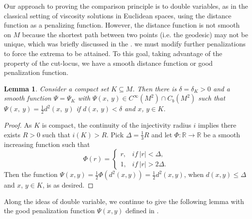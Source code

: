 \documentclass[a4paper]{article}
\numberwithin{equation}{section}
\newtheorem{lemma}[theorem]{Lemma}
\theoremstyle{definition}
\begin{document}
\par
Our approach to proving the comparison principle is to double variables, as in the classical setting of viscosity solutions in Euclidean spaces, using the distance function as a penalizing function. However, the distance function is not smooth on $M$ because the shortest path between two points (i.e. the geodesic) may not be unique, which was briefly discussed in the .
we must modify further penalizations to force the extrema to be attained. To this goal, taking advantage of  the property of the cut-locus, we have a smooth distance function or good penalization function.
\begin{lemma}\label{lem_smooth_function}
    Consider a compact set $K \subseteq M$. Then there is $\delta = \delta_K > 0$ and a smooth function $\Psi = \Psi_K$ with $\Psi(x,~y) \in C^\infty(M^2)\cap C_b(M^2)$ such that $\Psi(x,~y) = \frac{1}{2}d^2(x,~y)$ if $d(x,~y) <\delta $ and $x$, $y\in K$.
\end{lemma}
\begin{proof}
    As $K$ is compact, the continuity of the injectivity radius $i$ implies there exists $R > 0 $ such that $i(K ) > R$. Pick $\Delta  =\frac{1}{3}R$ and let $\Phi: \mathbb{R}\to \mathbb{R}$ be a smooth increasing function such that 
    \begin{equation*}
\Phi(r)=
\begin{cases}
r ,&if ~\mbox{$|r|<\Delta$,}\\
1,&if~\mbox{$|r|>2\Delta$.}
\end{cases}
\end{equation*} Then the function $\Psi(x,y)=\frac{1}{2}\Phi(d^2(x,y))=\frac{1}{2}d^2(x,y)$, when $d(x,y)\leq \Delta$ and $x$, $y\in K$, is as desired.
\end{proof}

Along the ideas of double variable, we continue to give the following lemma with the good penalization function $\Psi(x,y)$ defined in .
\end{document}
